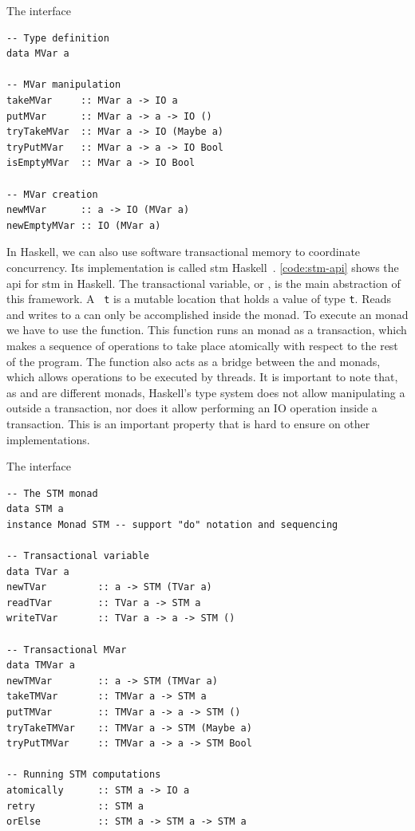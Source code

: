 \begin{listing}
  \caption{The \MVar interface}
  \begin{verbatim}
-- Type definition
data MVar a

-- MVar manipulation
takeMVar     :: MVar a -> IO a
putMVar      :: MVar a -> a -> IO ()
tryTakeMVar  :: MVar a -> IO (Maybe a)
tryPutMVar   :: MVar a -> a -> IO Bool
isEmptyMVar  :: MVar a -> IO Bool

-- MVar creation
newMVar      :: a -> IO (MVar a)
newEmptyMVar :: IO (MVar a)
  \end{verbatim}
  \label{code:mvar-api}
\end{listing}

In Haskell, we can also use software transactional memory to coordinate concurrency. Its implementation is called \acs{stm} Haskell~\cite{harris:2005}. \autoref{code:stm-api} shows the \acs{api} for \acs{stm} in Haskell. The transactional variable, or \TVar, is the main abstraction of this framework. A \TVar~\texttt{t} is a mutable location that holds a value of type \texttt{t}. Reads and writes to a \TVar can only be accomplished inside the \STM monad. To execute an \STM monad we have to use the \atomically function. This function runs an \STM monad as a transaction, which makes a sequence of operations to take place atomically with respect to the rest of the program. The \atomically function also acts as a bridge between the \IO and \STM monads, which allows \STM operations to be executed by threads. It is important to note that, as \STM and \IO are different monads, Haskell's type system does not allow manipulating a \TVar outside a transaction, nor does it allow performing an IO operation inside a transaction. This is an important property that is hard to ensure on other \STM implementations.

\begin{listing}
  \caption{The \STM interface}
  \begin{verbatim}
-- The STM monad
data STM a
instance Monad STM -- support "do" notation and sequencing

-- Transactional variable
data TVar a
newTVar         :: a -> STM (TVar a)
readTVar        :: TVar a -> STM a
writeTVar       :: TVar a -> a -> STM ()

-- Transactional MVar
data TMVar a
newTMVar        :: a -> STM (TMVar a)
takeTMVar       :: TMVar a -> STM a
putTMVar        :: TMVar a -> a -> STM ()
tryTakeTMVar    :: TMVar a -> STM (Maybe a)
tryPutTMVar     :: TMVar a -> a -> STM Bool

-- Running STM computations
atomically      :: STM a -> IO a
retry           :: STM a
orElse          :: STM a -> STM a -> STM a
  \end{verbatim}
  \label{code:stm-api}
\end{listing}

